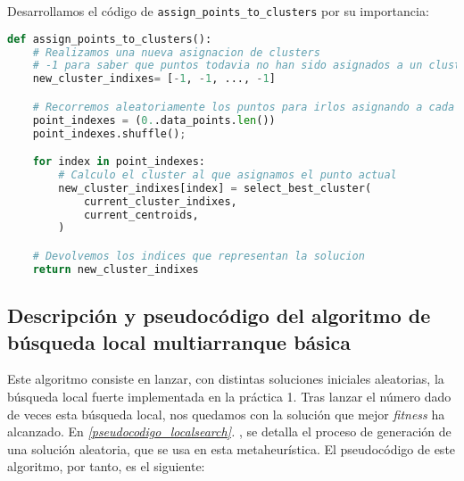 \documentclass[11pt]{article}
\begin{document}
Desarrollamos el código de \lstinline{assign_points_to_clusters} por su importancia:

\begin{lstlisting}[language=Python, style=Boxed]
def assign_points_to_clusters():
    # Realizamos una nueva asignacion de clusters
    # -1 para saber que puntos todavia no han sido asignados a un cluster
    new_cluster_indixes= [-1, -1, ..., -1]

    # Recorremos aleatoriamente los puntos para irlos asignando a cada cluster
    point_indexes = (0..data_points.len())
    point_indexes.shuffle();

    for index in point_indexes:
        # Calculo el cluster al que asignamos el punto actual
        new_cluster_indixes[index] = select_best_cluster(
            current_cluster_indixes,
            current_centroids,
        )

    # Devolvemos los indices que representan la solucion
    return new_cluster_indixes
\end{lstlisting}

\pagebreak

\subsection{Descripción y pseudocódigo del algoritmo de búsqueda local multiarranque básica}

Este algoritmo consiste en lanzar, con distintas soluciones iniciales aleatorias, la búsqueda local fuerte implementada en la práctica 1. Tras lanzar el número dado de veces esta búsqueda local, nos quedamos con la solución que mejor \emph{fitness} ha alcanzado. En \emph{\ref{pseudocodigo_localsearch}. }, se detalla el proceso de generación de una solución aleatoria, que se usa en esta metaheurística. El pseudocódigo de este algoritmo, por tanto, es el siguiente:
\end{document}
